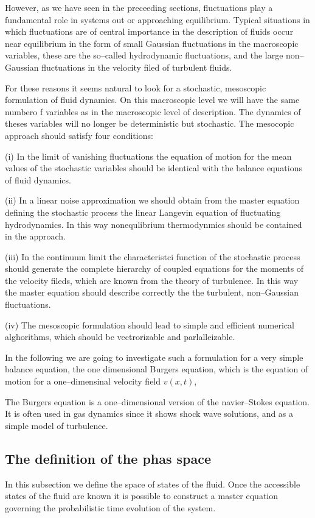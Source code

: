However, as we have seen in the preceeding sections, fluctuations play a
fundamental role in systems out or approaching equilibrium. Typical situations
in which fluctuations are of central importance in the description of fluids
occur near equilibrium in the form of small Gaussian fluctuations in the
macroscopic variables, these are the so--called hydrodynamic fluctuations,
and the large non--Gaussian fluctuations in the velocity filed of turbulent 
fluids.

For these reasons it seems natural to look for a  stochastic, mesoscopic
formulation of fluid dynamics. On this macroscopic level we will have the same
numbero f variables as in the macroscopic level of description. The dynamics
of theses variables will no longer be deterministic but stochastic. The
mesocopic approach should satisfy four conditions:

(i) In the limit of vanishing fluctuations the equation of motion for the 
mean values of the stochastic variables
should be identical with the balance equations of fluid dynamics.

(ii) In a linear noise approximation we should obtain from the master equation
defining the stochastic process the linear Langevin equation of fluctuating
hydrodynamics. In this way nonequlibrium thermodynmics should be contained in
the approach. 

(iii) In the continuum limit the characteristci function of the stochastic
process should generate the complete hierarchy of coupled equations for the
moments of the velocity fileds, which are known from the theory of
turbulence. In this way the master equation should describe correctly the the
turbulent, non--Gaussian fluctuations. 

(iv) The mesoscopic formulation should lead to simple and efficient numerical
alghorithms, which should be vectrorizable and parlalleizable.

In the  following we are going to investigate such a formulation for a very
simple balance equation, the one dimensional Burgers equation, which is the
equation of motion for a one--dimensinal velocity field $v(x,t)$,

The Burgers equation is a one--dimensional version of the navier--Stokes
equation. It is often used in gas dynamics since it shows shock wave
solutions, and as a simple model of turbulence.

\subsection{The definition of the phas space}
In this subsection we define the space of
states of the fluid. Once the accessible states of the fluid
are known it
is possible to construct a master equation governing the
probabilistic
time evolution of the system. 

